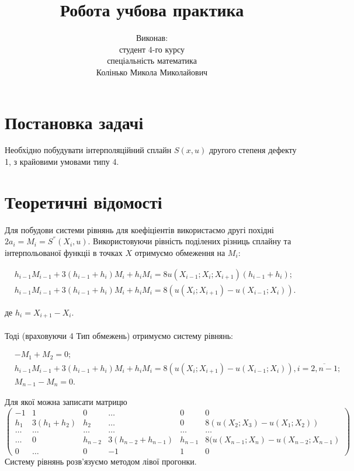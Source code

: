 \documentclass[titlepage]{article}
\begin{document}
\title{\LARGE Робота учбова практика}
\author{\vspace{12cm}Виконав: \protect\\ студент 4-го курсу \protect\\ спеціальність математика \protect\\ Колінько Микола Миколайович}
\date{}
\maketitle

\section{Постановка задачі}

Необхідно побудувати інтерполяційний сплайн $S(x, u)$ другого степеня дефекту 1, з крайовими умовами типу 4.
\section{Теоретичні відомості}

Для побудови системи рівнянь для коефіціентів використаємо другі похідні $2a_i = M_i = S^{''}(X_i, u)$. Використовуючи рівність поділених різниць сплайну та інтерпольованої функціі в точках $X$ отримуємо обмеження на $M_i$:

\begin{equation}
\begin{split}
&h_{i-1}M_{i-1} + 3(h_{i-1} + h_i)M_i + h_iM_i = 8u(X_{i-1};X_i;X_{i+1})(h_{i-1} + h_i);\\
&h_{i-1}M_{i-1} + 3(h_{i-1} + h_i)M_i + h_iM_i = 8(u(X_i; X_{i+1}) - u(X_{i-1}; X_i)).
\end{split}
\nonumber
\end{equation}

де $h_i = X_{i+1} - X_i$.\\
\\
Тоді (враховуючи 4 Тип обмежень) отримуємо систему рівнянь:

\begin{equation}
\begin{split}
&-M_1 + M_2= 0;\\
&h_{i-1}M_{i-1} + 3(h_{i-1} + h_i)M_i + h_iM_i = 8(u(X_i; X_{i+1}) - u(X_{i-1}; X_i)), i = \overline{2,n-1};\\
&M_{n-1} - M_{n} = 0.
\end{split}
\nonumber
\end{equation}

Для якої можна записати матрицю
\[\left(\begin{array}{ccccc|c}
-1 & 1 & 0 & \ldots & 0 & 0\\
h_1 & 3(h_1 + h_2) & h_2 & \ldots& 0  & 8(u(X_2; X_3) - u(X_1; X_2))\\
\ldots &\ldots &\ldots &\ldots &\ldots & \ldots\\
\ldots & 0 &h_{n-2} & 3(h_{n-2} + h_{n- 1}) & h_{n-1} & 8(u(X_{n-1}; X_n) - u(X_{n-2}; X_{n-1})\\
0 & \ldots & 0  & -1 & 1 & 0
\end{array}\right)\]
Систему рівнянь розв'язуємо методом лівої прогонки.
\end{document}
